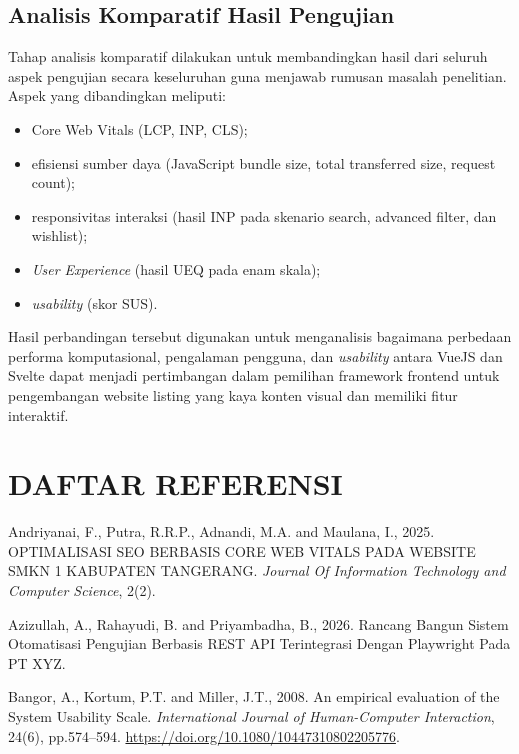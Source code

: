 \documentclass[12pt,a4paper]{report}
\begin{document}
\section{Analisis Komparatif Hasil Pengujian}
\label{sec:analisis-komparatif}
Tahap analisis komparatif dilakukan untuk membandingkan hasil dari seluruh aspek pengujian secara keseluruhan guna menjawab rumusan masalah penelitian. Aspek yang dibandingkan meliputi:
\begin{itemize}
    \item Core Web Vitals (LCP, INP, CLS);
    \item efisiensi sumber daya (JavaScript bundle size, total transferred size, request count);
    \item responsivitas interaksi (hasil INP pada skenario search, advanced filter, dan wishlist);
    \item \textit{User Experience} (hasil UEQ pada enam skala);
    \item \textit{usability} (skor SUS).
\end{itemize}

Hasil perbandingan tersebut digunakan untuk menganalisis bagaimana perbedaan performa komputasional, pengalaman pengguna, dan \textit{usability} antara VueJS dan Svelte dapat menjadi pertimbangan dalam pemilihan framework frontend untuk pengembangan website listing yang kaya konten visual dan memiliki fitur interaktif.

\clearpage
\chapter*{\centering DAFTAR REFERENSI}

\noindent Andriyanai, F., Putra, R.R.P., Adnandi, M.A. and Maulana, I., 2025. OPTIMALISASI SEO BERBASIS CORE WEB VITALS PADA WEBSITE SMKN 1 KABUPATEN TANGERANG. \textit{Journal Of Information Technology and Computer Science}, 2(2).

\vspace{0.6em}
\noindent Azizullah, A., Rahayudi, B. and Priyambadha, B., 2026. Rancang Bangun Sistem Otomatisasi Pengujian Berbasis REST API Terintegrasi Dengan Playwright Pada PT XYZ.

\vspace{0.6em}
\noindent Bangor, A., Kortum, P.T. and Miller, J.T., 2008. An empirical evaluation of the System Usability Scale. \textit{International Journal of Human-Computer Interaction}, 24(6), pp.574--594. \url{https://doi.org/10.1080/10447310802205776}.
\end{document}
